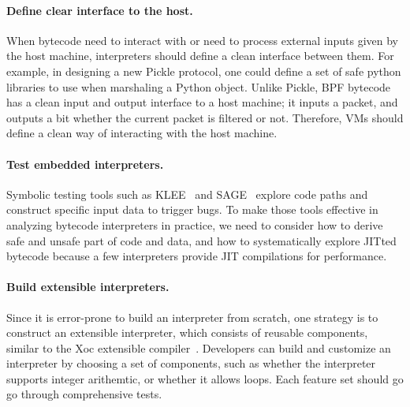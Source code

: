 


\paragraph{Define clear interface to the host.}

When bytecode need to interact with or need to process external inputs given by
the host machine, interpreters should define a clean interface between them. For example,
in designing a new Pickle protocol, one could define a set of safe python libraries
to use when marshaling a Python object. Unlike Pickle, BPF bytecode has a clean
input and output interface to a host machine; it inputs a packet, and outputs a
bit whether the current packet is filtered or not. Therefore, VMs should define
a clean way of interacting with the host machine.

\paragraph{Test embedded interpreters.}

Symbolic testing tools such as KLEE~\cite{cadar:klee} and
SAGE~\cite{Godefroid:sage} explore code paths and construct specific input data
to trigger bugs.  To make those tools effective in analyzing bytecode
interpreters in practice, we need to consider how to derive safe and unsafe part
of code and data, and how to systematically explore JITted bytecode because a few
interpreters provide JIT compilations for performance.

\paragraph{Build extensible interpreters.}
Since it is error-prone to build an interpreter from scratch,
one strategy is to construct an extensible interpreter,
which consists of reusable components,
similar to the Xoc extensible compiler~\cite{cox:xoc}.
Developers can build and customize an interpreter by choosing a set of
components, such as whether the interpreter supports integer arithemtic,
or whether it allows loops.  Each feature set should go go through
comprehensive tests.
\fi
